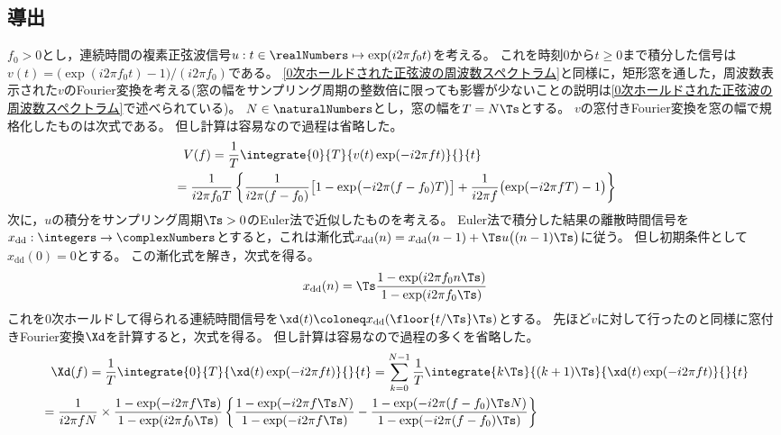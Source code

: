         \subsection{導出}
            \newcommand{\xdd}{x_\text{dd}}
            $f_0>0$とし，連続時間の複素正弦波信号$u:t\in\realNumbers\mapsto\exp(i 2\pi f_0 t)$を考える。
            これを時刻$0$から$t\geq 0$まで積分した信号は$v(t) = \bigl(\exp(i 2\pi f_0 t)-1\bigr) / (i 2\pi f_0)$である。
            \ref{0次ホールドされた正弦波の周波数スペクトラム}と同様に，矩形窓を通した，周波数表示された$v$のFourier変換を考える(窓の幅をサンプリング周期の整数倍に限っても影響が少ないことの説明は\ref{0次ホールドされた正弦波の周波数スペクトラム}で述べられている)。
            $N\in\naturalNumbers$とし，窓の幅を$T=N\Ts$とする。
            $v$の窓付きFourier変換を窓の幅で規格化したものは次式である。
            但し計算は容易なので過程は省略した。
            \begin{align*}
                &\phantom{=} V(f) = \frac{1}{T} \integrate{0}{T}{v(t)\exp(-i 2\pi f t)}{}{t} \\
                &= \frac{1}{i 2\pi f_0 T} \left\{\frac{1}{i 2\pi (f-f_0)}\bigl[1 - \exp\bigl(-i 2\pi (f-f_0)T\bigr)\bigr] + \frac{1}{i 2\pi f}\bigl(\exp(-i 2\pi f T) - 1\bigr)\right\}
            \end{align*}
            次に，$u$の積分をサンプリング周期$\Ts>0$のEuler法で近似したものを考える。
            Euler法で積分した結果の離散時間信号を$\xdd:\integers\to\complexNumbers$とすると，これは漸化式$\xdd(n) = \xdd(n-1) + \Ts u\bigl((n-1)\Ts\bigr)$に従う。
            但し初期条件として$\xdd(0)=0$とする。
            この漸化式を解き，次式を得る。
            \[ \xdd(n) = \Ts\frac{1-\exp(i 2\pi f_0 n\Ts)}{1-\exp(i 2\pi f_0\Ts)} \]
            これを0次ホールドして得られる連続時間信号を$\xd(t) \coloneq \xdd(\floor{t/\Ts}\Ts)$とする。
            先ほど$v$に対して行ったのと同様に窓付きFourier変換$\Xd$を計算すると，次式を得る。
            但し計算は容易なので過程の多くを省略した。
            \begin{align*}
                &\phantom{=} \Xd(f) = \frac{1}{T} \integrate{0}{T}{\xd(t)\exp(-i 2\pi f t)}{}{t} = \sum_{k=0}^{N-1} \frac{1}{T} \integrate{k\Ts}{(k+1)\Ts}{\xd(t)\exp(-i 2\pi f t)}{}{t} \\
                &= \frac{1}{i 2\pi f N}\times\frac{1-\exp(-i 2\pi f\Ts)}{1-\exp(i 2\pi f_0\Ts)} \left\{\frac{1-\exp(-i 2\pi f \Ts N)}{1-\exp(-i 2\pi f \Ts)} - \frac{1-\exp(-i 2\pi (f-f_0) \Ts N)}{1-\exp(-i 2\pi (f-f_0) \Ts)}\right\}
            \end{align*}
